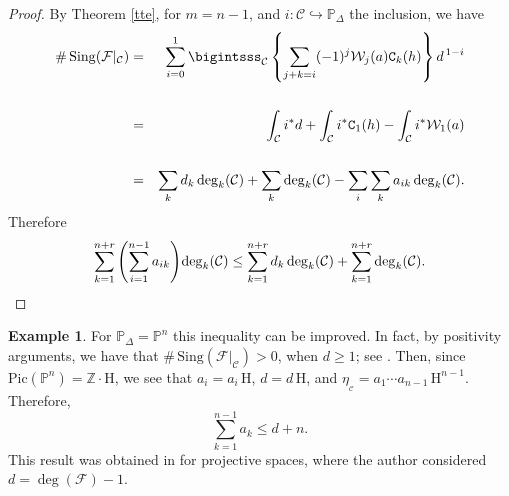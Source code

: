 \documentclass[11pt]{amsart}
\theoremstyle{plain}
\theoremstyle{definition}
\newtheorem{exe}{Example}[section]
\begin{document}
\vskip 0.1cm

\begin{proof}
By Theorem \ref{tte}, for $m=n-1$, and $i:\mathcal{C}\hookrightarrow\mathbb{P}_{\Delta}$ the inclusion, we have
\begin{eqnarray*}
\#\,\mathrm{Sing}(\mathcal{F}|_\mathcal{C})&=&
\sum_{i=0}^1\displaystyle\bigintsss_{\mathcal{C}}\left\{\sum_{j+k=i}(-1)^{j}\mathcal{W}_j(a)\texttt{C}_{k}(h)\right\}d^{\,1-i}\\ \\
&=&\int_{\mathcal{C}}i^{\ast}d+\int_{\mathcal{C}}i^{\ast}\texttt{C}_1(h)-\int_{\mathcal{C}}i^{\ast}\mathcal{W}_1(a) \\ \\
&=&\sum_k d_k \deg_k(\mathcal{C})+\sum_k \deg_k(\mathcal{C})
-\sum_i \sum_k a_{ik} \deg_k(\mathcal{C}).
\end{eqnarray*}
Therefore 
$$\sum_{k=1}^{n+r} \left(\sum_{i=1}^{n-1}a_{ik}\right) \hspace{-0,5mm} \deg_k(\mathcal{C}) \leq \sum_{k=1}^{n+r} d_k \deg_k(\mathcal{C})
+\sum_{k=1}^{n+r} \deg_k(\mathcal{C}).$$
\end{proof}

\begin{exe} For $\mathbb{P}_{\Delta}=\mathbb{P}^n$ this inequality can be improved. In fact, 
by positivity arguments, we have that $\#\,\mathrm{Sing}(\mathcal{F}|_\mathcal{C})>0$, when $d\geq1$; see \cite{Mar}. 
Then, since $\mathrm{Pic}(\mathbb{P}^n)=\mathbb{Z}\cdot\mathrm{H}$,
we see that $a_i=a_i\,\mathrm{H}$, $d=d\,\mathrm{H}$, and $\eta_{_\mathcal{C}}=a_1\cdots a_{n-1}\,\mathrm{H}^{n-1}$. Therefore,
$$\sum_{k=1}^{n-1}a_k\leq d+n.$$
This result was obtained in \cite{Mar} for projective spaces, where the author considered $d=\deg(\mathcal{F})-1$.
\end{exe}
















\end{document}
